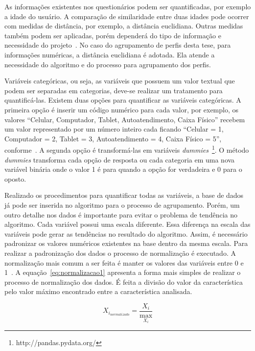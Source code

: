 As informações existentes nos questionários podem ser quantificadas, por exemplo a idade do usuário. A comparação de similaridade entre duas idades pode ocorrer com medidas de distância, por exemplo, a distância euclidiana. Outras medidas também podem ser aplicadas, porém dependerá do tipo de informação e necessidade do projeto~\cite{masiero:2011, masiero:2013}. No caso do agrupamento de perfis desta tese, para informações numéricas, a distância euclidiana é adotada. Ela atende a necessidade do algoritmo e do processo para agrupamento dos perfis.

Variáveis categóricas, ou seja, as variáveis que possuem um valor textual que podem ser separadas em categorias, deve-se realizar um tratamento para quantificá-las. Existem duas opções para quantificar as variáveis categóricas. A primeira opção é inserir um código numérico para cada valor, por exemplo, os valores ``Celular, Computador, Tablet, Autoatendimento, Caixa Físico'' recebem um valor representado por um número inteiro cada ficando ``Celular = 1, Computador = 2, Tablet = 3, Autoatendimento = 4, Caixa Físico = 5'', conforme~. A segunda opção é transformá-las em variáveis \emph{dummies}~\footnote{http://pandas.pydata.org/}. O método \emph{dummies} transforma cada opção de resposta ou cada categoria em uma nova variável binária onde o valor 1 é para quando a opção for verdadeira e 0 para o oposto.

Realizado os procedimentos para quantificar todas as variáveis, a base de dados já pode ser inserida no algoritmo para o processo de agrupamento. Porém, um outro detalhe nos dados é importante para evitar o problema de tendência no algoritmo. Cada variável possui uma escala diferente. Essa diferença na escala das variáveis pode gerar as tendências no resultado do algoritmo. Assim, é necessário padronizar os valores numéricos existentes na base dentro da mesma escala. Para realizar a padronização dos dados o processo de normalização é executado. A normalização mais comum a ser feita é manter os valores das variáveis entre 0 e 1~\cite{lattin:2011}. A equação~\ref{eq:normalizacao1} apresenta a forma mais simples de realizar o processo de normalização dos dados. É feita a divisão do valor da característica pelo valor máximo encontrado entre a característica analisada.

\begin{equation}
	X_{i_{normalizado}} = \frac{X_i}{\max_{X_i}}
	\label{eq:normalizacao1}
\end{equation}

